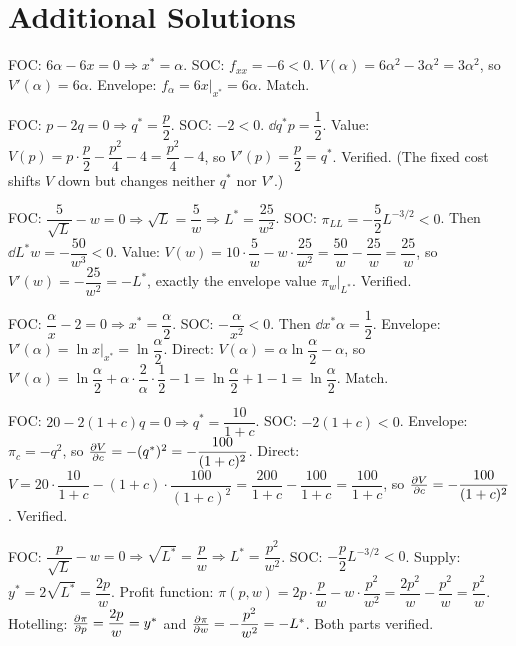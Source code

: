 \section{Additional Solutions}

\begin{solutions}
  \item FOC: $6\alpha-6x=0\Rightarrow x^*=\alpha$. SOC: $f_{xx}=-6<0$.
        $V(\alpha)=6\alpha^2-3\alpha^2=3\alpha^2$, so $V'(\alpha)=6\alpha$.
        Envelope: $f_\alpha=6x\big|_{x^*}=6\alpha$. Match.

  \item FOC: $p-2q=0\Rightarrow q^*=\dfrac p2$. SOC: $-2<0$.
        $\dd{q^*}{p}=\dfrac12$. Value:
        $V(p)=p\cdot\dfrac p2-\dfrac{p^2}4-4=\dfrac{p^2}4-4$, so
        $V'(p)=\dfrac p2=q^*$. Verified. (The fixed cost shifts $V$
        down but changes neither $q^*$ nor $V'$.)

  \item FOC: $\dfrac{5}{\sqrt L}-w=0\Rightarrow\sqrt L=\dfrac5w
        \Rightarrow L^*=\dfrac{25}{w^2}$. SOC:
        $\pi_{LL}=-\dfrac52L^{-3/2}<0$. Then
        $\dd{L^*}{w}=-\dfrac{50}{w^3}<0$. Value:
        $V(w)=10\cdot\dfrac5w-w\cdot\dfrac{25}{w^2}
        =\dfrac{50}w-\dfrac{25}w=\dfrac{25}w$, so
        $V'(w)=-\dfrac{25}{w^2}=-L^*$, exactly the envelope value
        $\pi_w\big|_{L^*}$. Verified.

  \item FOC: $\dfrac{\alpha}{x}-2=0\Rightarrow x^*=\dfrac{\alpha}{2}$.
        SOC: $-\dfrac{\alpha}{x^2}<0$. Then
        $\dd{x^*}{\alpha}=\dfrac12$. Envelope:
        $V'(\alpha)=\ln x\big|_{x^*}=\ln\dfrac{\alpha}{2}$. Direct:
        $V(\alpha)=\alpha\ln\dfrac{\alpha}{2}-\alpha$, so
        $V'(\alpha)=\ln\dfrac{\alpha}{2}
        +\alpha\cdot\dfrac{2}{\alpha}\cdot\dfrac12-1
        =\ln\dfrac{\alpha}{2}+1-1=\ln\dfrac{\alpha}{2}$. Match.

  \item FOC: $20-2(1+c)q=0\Rightarrow q^*=\dfrac{10}{1+c}$. SOC:
        $-2(1+c)<0$. Envelope: $\pi_c=-q^2$, so
        $\frac{\partial V}{\partial c}=-(q^*)^2=-\dfrac{100}{(1+c)^2}$. Direct:
        $V=20\cdot\dfrac{10}{1+c}-(1+c)\cdot\dfrac{100}{(1+c)^2}
        =\dfrac{200}{1+c}-\dfrac{100}{1+c}=\dfrac{100}{1+c}$, so
        $\frac{\partial V}{\partial c}=-\dfrac{100}{(1+c)^2}$. Verified.

  \item FOC: $\dfrac{p}{\sqrt L}-w=0\Rightarrow\sqrt{L^*}=\dfrac pw
        \Rightarrow L^*=\dfrac{p^2}{w^2}$. SOC:
        $-\dfrac p2L^{-3/2}<0$. Supply:
        $y^*=2\sqrt{L^*}=\dfrac{2p}{w}$. Profit function:
        $\pi(p,w)=2p\cdot\dfrac pw-w\cdot\dfrac{p^2}{w^2}
        =\dfrac{2p^2}{w}-\dfrac{p^2}{w}=\dfrac{p^2}{w}$. Hotelling:
        $\frac{\partial \pi}{\partial p}=\dfrac{2p}{w}=y^*$ and
        $\frac{\partial \pi}{\partial w}=-\dfrac{p^2}{w^2}=-L^*$. Both parts verified.


\end{solutions}
